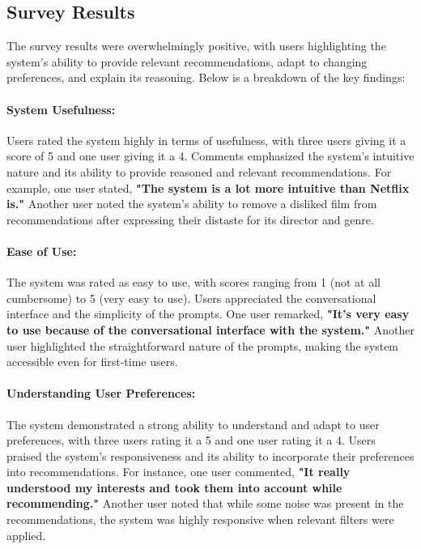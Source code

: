 \subsection{Survey Results}
\label{sec:survey_results}
The survey results were overwhelmingly positive, with users highlighting the system's ability to provide relevant recommendations, adapt to changing preferences, and explain its reasoning. Below is a breakdown of the key findings:

\paragraph{System Usefulness:}  
Users rated the system highly in terms of usefulness, with three users giving it a score of 5 and one user giving it a 4. Comments emphasized the system's intuitive nature and its ability to provide reasoned and relevant recommendations. For example, one user stated, \textbf{"The system is a lot more intuitive than Netflix is."} Another user noted the system's ability to remove a disliked film from recommendations after expressing their distaste for its director and genre.

\paragraph{Ease of Use:}  
The system was rated as easy to use, with scores ranging from 1 (not at all cumbersome) to 5 (very easy to use). Users appreciated the conversational interface and the simplicity of the prompts. One user remarked, \textbf{"It's very easy to use because of the conversational interface with the system."} Another user highlighted the straightforward nature of the prompts, making the system accessible even for first-time users.

\paragraph{Understanding User Preferences:}  
The system demonstrated a strong ability to understand and adapt to user preferences, with three users rating it a 5 and one user rating it a 4. Users praised the system's responsiveness and its ability to incorporate their preferences into recommendations. For instance, one user commented, \textbf{"It really understood my interests and took them into account while recommending."} Another user noted that while some noise was present in the recommendations, the system was highly responsive when relevant filters were applied.

